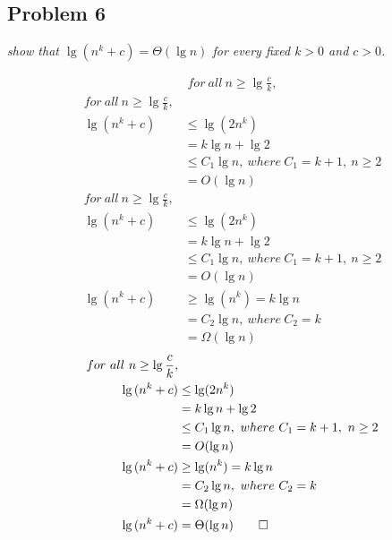 \documentclass{beamer}
\begin{document}
        
        
    \subsection{Problem 6}
    
        \begin{frame}[c,shrink]{\subsecname}
            \textit{show that $\lg(n^k+c) = \Theta(\lg{n})$ for every fixed $k>0$ and $c>0$.}
            \begin{overprint}
            \begin{align*}
                for\ all\ n \geq \lg{\frac{c}{k}},
            \end{align*}
            \begin{align*}
                for\ all\ n \geq \lg{\frac{c}{k}},&\\
                \lg{(n^k+c)} &\leq \lg(2n^k)\\
                		  &=    k\lg{n}+\lg{2}\\
                		  &\leq C_1\lg{n},\ where\ C_1= k+1,\ n\geq 2\\
                		  &=    O(\lg{n})
            \end{align*}
            \begin{align*}
                for\ all\ n \geq \lg{\frac{c}{k}},&\\
                \lg{(n^k+c)} &\leq \lg(2n^k)\\
                		  &=    k\lg{n}+\lg{2}\\
                		  &\leq C_1\lg{n},\ where\ C_1= k+1,\ n\geq 2\\
                		  &=    O(\lg{n})\\
                \lg{(n^k+c)} &\geq \lg(n^k) = k\lg{n}\\
                		  &= C_2\lg{n},\ where\ C_2= k\\
                		  &= \Omega(\lg{n})
            \end{align*}
            \begin{align*}
                for\ all\ n \geq \lg{\frac{c}{k}},&\\
                \lg{(n^k+c)} &\leq \lg(2n^k)\\
                		  &=    k\lg{n}+\lg{2}\\
                		  &\leq C_1\lg{n},\ where\ C_1= k+1,\ n\geq 2\\
                		  &=    O(\lg{n})\\
                \lg{(n^k+c)} &\geq \lg(n^k) = k\lg{n}\\
                		  &= C_2\lg{n},\ where\ C_2= k\\
                		  &= \Omega(\lg{n})\\
                \lg{(n^k+c)} &= \Theta(\lg{n}) \qed
            \end{align*}
            \end{overprint}
        \end{frame}
        
\end{document}
